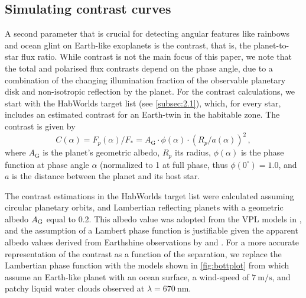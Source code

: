 \documentclass[usenatbib]{mnras}
\newcommand{\HWO}{HabWorlds\xspace}
\begin{document}
\subsection{Simulating contrast curves}
\label{subsec:2.4}

A second parameter that is crucial for detecting angular features like rainbows and ocean glint on Earth-like exoplanets is the contrast, that is, the planet-to-star flux ratio. 
%
While contrast is not the main focus of this paper, we note that the total and polarised flux contrasts depend on the phase angle, due to a combination of the changing illumination fraction of the observable planetary disk and non-isotropic reflection by the planet.
%
For the contrast calculations, we start with the \HWO target list (see \cref{subsec:2.1}), which, for every star, includes an estimated contrast for an Earth-twin in the habitable zone.
%
The contrast is given by \citep[e.g.,][]{2023A&A...671A.165M}
\begin{equation}
    C(\alpha) 
    = F_p(\alpha) / F_* 
    = A_\mathrm{G} \cdot \phi(\alpha) \cdot \left( R_p / a(\alpha) \right)^2 \,,
    \label{eq:contrast}
\end{equation}
where $A_\mathrm{G}$ is the planet's geometric albedo, $R_p$ its radius, $\phi(\alpha)$ is the phase function at phase angle $\alpha$ (normalized to \num{1} at full phase, thus $\phi(0^\circ)= 1.0$, and $a$ is the distance between the planet and its host star.
%

The contrast estimations in the \HWO target list were 
calculated assuming circular planetary orbits, and Lambertian reflecting planets \citep{Russell1916} with a geometric albedo $A_{\rm G}$ equal to 0.2.
This albedo value was adopted from the VPL models in \citet{Robinson2011}, and the assumption of a Lambert phase function is justifiable given the apparent albedo values derived from Earthshine observations by \citet{Qiu2003} and \citet{Palle2003}.
For a more accurate representation of the contrast as a function of the separation, we replace the Lambertian phase function with the models shown in \cref{fig:bottplot} from \citet{treesandstam2019} which assume an Earth-like planet with an ocean surface, a wind-speed of $\qty{7}{\meter\per\second}$, and patchy liquid water clouds observed at $\lambda = \qty{670}{\nano\meter}$. 
\end{document}
